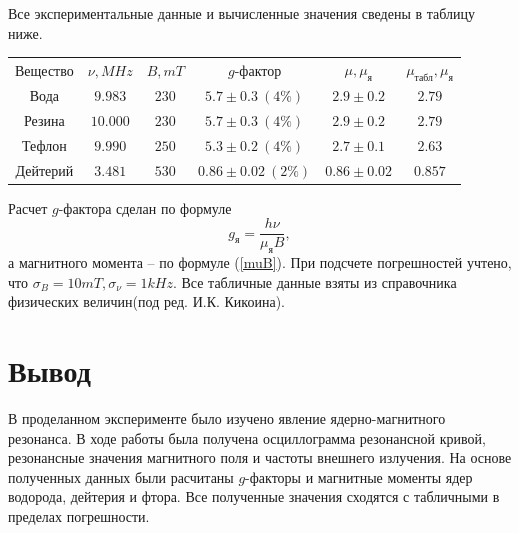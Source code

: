\documentclass[12pt,a4paper]{article}
\begin{document}
Все экспериментальные данные и вычисленные значения сведены в таблицу ниже. 

\begin{center}
\begin{tabular}{cccccc}
Вещество 	& $\nu, MHz$	& $B, mT$ 	& $g$-фактор 							& $\mu, \mu_\text{я}$ 	& $\mu_\text{табл}, \mu_\text{я}$ \\
Вода				& $ 9.983 $ 	& $ 230 $  	& $5.7 \pm 0.3 \ (4 \%)$ 		& $2.9 \pm 0.2$			   	& $2.79$ \\
Резина			& $ 10.000 $ 	& $ 230 $ 	& $5.7 \pm 0.3 \ (4 \%)$ 		& $2.9 \pm 0.2$				& $2.79$ \\
Тефлон		& $ 9.990 $   	& $ 250 $ 	& $5.3 \pm 0.2 \ (4 \%)$ 		& $2.7 \pm 0.1$				& $2.63 $ \\
Дейтерий		& $ 3.481 $		& $ 530 $ 	& $0.86 \pm 0.02 \ (2 \%)$ 	& $0.86 \pm 0.02$			& $0.857$ \\ 
\end{tabular}
\end{center}

Расчет $g$-фактора сделан по формуле 
\begin{equation}
g_\text{я} = \frac{h \nu}{\mu_\text{я} B}, 
\end{equation}
а магнитного момента -- по формуле (\ref{muB}). При подсчете погрешностей учтено, что $\sigma_B = 10 mT, \sigma_\nu = 1kHz$. Все табличные данные взяты из справочника физических величин(под ред. И.К. Кикоина).

\section{Вывод}

В проделанном эксперименте было изучено явление ядерно-магнитного резонанса. В ходе работы была получена осциллограмма резонансной кривой, резонансные значения магнитного поля и частоты внешнего излучения. На основе полученных данных были расчитаны $g$-факторы и магнитные моменты ядер водорода, дейтерия и фтора. Все полученные значения сходятся с табличными в пределах погрешности.
\end{document}
